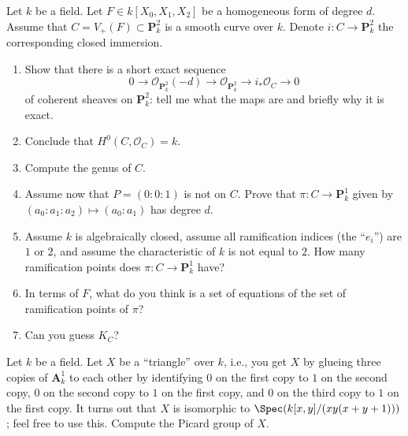 \begin{exercise}
\label{exercise-genus-plane-curve}
Let $k$ be a field.
Let $F \in k[X_0, X_1, X_2]$ be a homogeneous form of degree $d$.
Assume that $C = V_{+}(F) \subset \mathbf{P}^2_k$ is a smooth curve over $k$.
Denote $i : C \to \mathbf{P}^2_k$ the corresponding closed immersion.
\begin{enumerate}
\item Show that there is a short exact sequence
$$
0 \to \mathcal{O}_{\mathbf{P}^2_k}(-d)
\to \mathcal{O}_{\mathbf{P}^2_k} \to i_*\mathcal{O}_C \to 0
$$
of coherent sheaves on $\mathbf{P}^2_k$: tell me what the maps are
and briefly why it is exact.
\item Conclude that $H^0(C, \mathcal{O}_C) = k$.
\item Compute the genus of $C$.
\item Assume now that $P = (0 : 0 : 1)$ is not on $C$. Prove that
$\pi : C \to \mathbf{P}^1_k$ given by $(a_0 : a_1 : a_2) \mapsto (a_0 : a_1)$
has degree $d$.
\item Assume $k$ is algebraically closed, assume all ramification indices
(the ``$e_i$'') are $1$ or $2$, and assume the characteristic of $k$
is not equal to $2$. How many ramification
points does $\pi : C \to \mathbf{P}^1_k$ have?
\item In terms of $F$, what do you think is a set of equations of
the set of ramification points of $\pi$?
\item Can you guess $K_C$?
\end{enumerate}
\end{exercise}

\begin{exercise}
\label{exercise-Pic-triangle}
Let $k$ be a field. Let $X$ be a ``triangle'' over $k$, i.e.,
you get $X$ by glueing three copies of $\mathbf{A}^1_k$ to each other by
identifying $0$ on the first copy to $1$ on the second copy, $0$ on the
second copy to $1$ on the first copy, and $0$ on the third copy to $1$ on
the first copy. It turns out that $X$ is isomorphic to
$\Spec(k[x, y]/(xy(x + y + 1)))$; feel free to use this.
Compute the Picard group of $X$.
\end{exercise}

